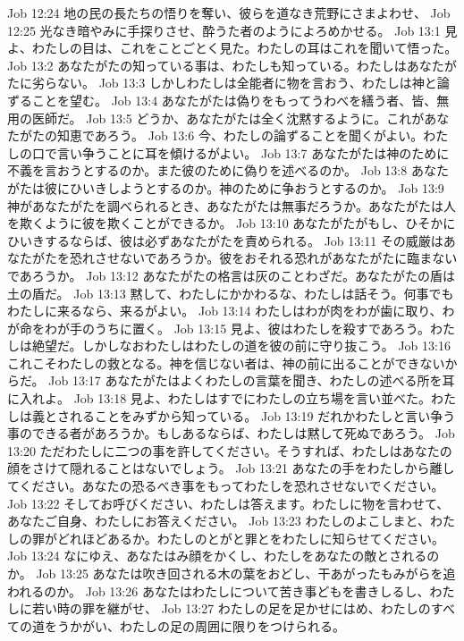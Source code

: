 Job 12:24  地の民の長たちの悟りを奪い、彼らを道なき荒野にさまよわせ、
Job 12:25  光なき暗やみに手探りさせ、酔うた者のようによろめかせる。
Job 13:1  見よ、わたしの目は、これをことごとく見た。わたしの耳はこれを聞いて悟った。
Job 13:2  あなたがたの知っている事は、わたしも知っている。わたしはあなたがたに劣らない。
Job 13:3  しかしわたしは全能者に物を言おう、わたしは神と論ずることを望む。
Job 13:4  あなたがたは偽りをもってうわべを繕う者、皆、無用の医師だ。
Job 13:5  どうか、あなたがたは全く沈黙するように。これがあなたがたの知恵であろう。
Job 13:6  今、わたしの論ずることを聞くがよい。わたしの口で言い争うことに耳を傾けるがよい。
Job 13:7  あなたがたは神のために不義を言おうとするのか。また彼のために偽りを述べるのか。
Job 13:8  あなたがたは彼にひいきしようとするのか。神のために争おうとするのか。
Job 13:9  神があなたがたを調べられるとき、あなたがたは無事だろうか。あなたがたは人を欺くように彼を欺くことができるか。
Job 13:10  あなたがたがもし、ひそかにひいきするならば、彼は必ずあなたがたを責められる。
Job 13:11  その威厳はあなたがたを恐れさせないであろうか。彼をおそれる恐れがあなたがたに臨まないであろうか。
Job 13:12  あなたがたの格言は灰のことわざだ。あなたがたの盾は土の盾だ。
Job 13:13  黙して、わたしにかかわるな、わたしは話そう。何事でもわたしに来るなら、来るがよい。
Job 13:14  わたしはわが肉をわが歯に取り、わが命をわが手のうちに置く。
Job 13:15  見よ、彼はわたしを殺すであろう。わたしは絶望だ。しかしなおわたしはわたしの道を彼の前に守り抜こう。
Job 13:16  これこそわたしの救となる。神を信じない者は、神の前に出ることができないからだ。
Job 13:17  あなたがたはよくわたしの言葉を聞き、わたしの述べる所を耳に入れよ。
Job 13:18  見よ、わたしはすでにわたしの立ち場を言い並べた。わたしは義とされることをみずから知っている。
Job 13:19  だれかわたしと言い争う事のできる者があろうか。もしあるならば、わたしは黙して死ぬであろう。
Job 13:20  ただわたしに二つの事を許してください。そうすれば、わたしはあなたの顔をさけて隠れることはないでしょう。
Job 13:21  あなたの手をわたしから離してください。あなたの恐るべき事をもってわたしを恐れさせないでください。
Job 13:22  そしてお呼びください、わたしは答えます。わたしに物を言わせて、あなたご自身、わたしにお答えください。
Job 13:23  わたしのよこしまと、わたしの罪がどれほどあるか。わたしのとがと罪とをわたしに知らせてください。
Job 13:24  なにゆえ、あなたはみ顔をかくし、わたしをあなたの敵とされるのか。
Job 13:25  あなたは吹き回される木の葉をおどし、干あがったもみがらを追われるのか。
Job 13:26  あなたはわたしについて苦き事どもを書きしるし、わたしに若い時の罪を継がせ、
Job 13:27  わたしの足を足かせにはめ、わたしのすべての道をうかがい、わたしの足の周囲に限りをつけられる。
